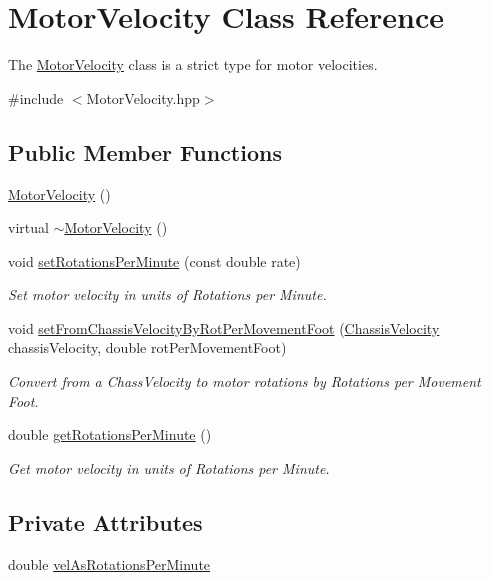 \hypertarget{classMotorVelocity}{\section{Motor\-Velocity Class Reference}
\label{classMotorVelocity}
}


The \hyperlink{classMotorVelocity}{Motor\-Velocity} class is a strict type for motor velocities.  




{\ttfamily \#include $<$Motor\-Velocity.\-hpp$>$}

\subsection*{Public Member Functions}
\begin{DoxyCompactItemize}
\item 
\hyperlink{classMotorVelocity_a710b857c335bdf69b986b23799b808f7}{Motor\-Velocity} ()
\item 
virtual \hyperlink{classMotorVelocity_af9a29b17b271b8b6c45c624a6764253e}{$\sim$\-Motor\-Velocity} ()
\item 
void \hyperlink{classMotorVelocity_a2ad99a1d1f49d767fa4eea224071d3a1}{set\-Rotations\-Per\-Minute} (const double rate)
\begin{DoxyCompactList}\small\item\em Set motor velocity in units of Rotations per Minute. \end{DoxyCompactList}\item 
void \hyperlink{classMotorVelocity_a6c5872379f7055a2d19635c68200dcc6}{set\-From\-Chassis\-Velocity\-By\-Rot\-Per\-Movement\-Foot} (\hyperlink{classChassisVelocity}{Chassis\-Velocity} chassis\-Velocity, double rot\-Per\-Movement\-Foot)
\begin{DoxyCompactList}\small\item\em Convert from a Chass\-Velocity to motor rotations by Rotations per Movement Foot. \end{DoxyCompactList}\item 
double \hyperlink{classMotorVelocity_a765517747b7fc90d5c0aee77c066a830}{get\-Rotations\-Per\-Minute} ()
\begin{DoxyCompactList}\small\item\em Get motor velocity in units of Rotations per Minute. \end{DoxyCompactList}\end{DoxyCompactItemize}
\subsection*{Private Attributes}
\begin{DoxyCompactItemize}
\item 
double \hyperlink{classMotorVelocity_a1814d196cb74a2a0c1df5ce494714aea}{vel\-As\-Rotations\-Per\-Minute}
\end{DoxyCompactItemize}


